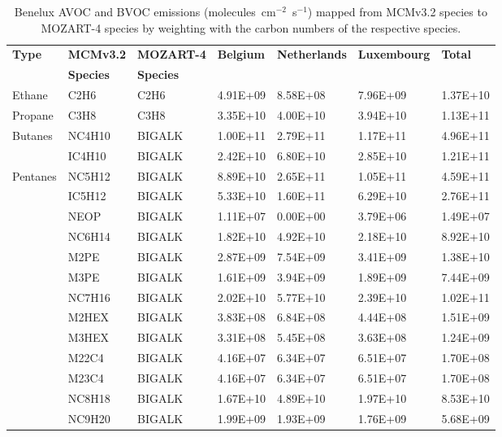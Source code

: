\footnotesize
\begin{longtable}{lllllll}
	\caption{Benelux AVOC and BVOC emissions (molecules~cm$^{-2}$~s$^{-1}$) mapped from MCMv3.2 species to MOZART-4 species by weighting with the carbon numbers of the respective species.}\\%
	\hline \hline
	\multirow{2}{*}{\textbf{Type}} & \textbf{MCMv3.2} & \textbf{MOZART-4} & \multirow{2}{*}{\textbf{Belgium}} & \multirow{2}{*}{\textbf{Netherlands}} & \multirow{2}{*}{\textbf{Luxembourg}} & \multirow{2}{*}{\textbf{Total}} \\
 & \textbf{Species} & \textbf{Species} & & & & \\
	\endhead
	\hline
	Ethane & C2H6 & C2H6 & 4.91E+09 & 8.58E+08 & 7.96E+09 & 1.37E+10 \\
	\hline Propane & C3H8 & C3H8 & 3.35E+10 & 4.00E+10 & 3.94E+10 & 1.13E+11 \\ \hline
	\multirow{2}{*}{Butanes} & NC4H10 & BIGALK & 1.00E+11 & 2.79E+11 & 1.17E+11 & 4.96E+11 \\
	 & IC4H10 & BIGALK & 2.42E+10 & 6.80E+10 & 2.85E+10 & 1.21E+11 \\
	\hline \multirow{3}{*}{Pentanes} & NC5H12 & BIGALK & 8.89E+10 & 2.65E+11 & 1.05E+11 & 4.59E+11 \\
	 & IC5H12 & BIGALK & 5.33E+10 & 1.60E+11 & 6.29E+10 & 2.76E+11 \\
	 & NEOP & BIGALK & 1.11E+07 & 0.00E+00 & 3.79E+06 & 1.49E+07 \\
	\hline \parbox[t]{2mm}{} & NC6H14 & BIGALK & 1.82E+10 & 4.92E+10 & 2.18E+10 & 8.92E+10 \\
	 & M2PE & BIGALK & 2.87E+09 & 7.54E+09 & 3.41E+09 & 1.38E+10 \\
	 & M3PE & BIGALK & 1.61E+09 & 3.94E+09 & 1.89E+09 & 7.44E+09 \\
	 & NC7H16 & BIGALK & 2.02E+10 & 5.77E+10 & 2.39E+10 & 1.02E+11 \\
	 & M2HEX & BIGALK & 3.83E+08 & 6.84E+08 & 4.44E+08 & 1.51E+09 \\
	 & M3HEX & BIGALK & 3.31E+08 & 5.45E+08 & 3.63E+08 & 1.24E+09 \\
	 & M22C4 & BIGALK & 4.16E+07 & 6.34E+07 & 6.51E+07 & 1.70E+08 \\
	 & M23C4 & BIGALK & 4.16E+07 & 6.34E+07 & 6.51E+07 & 1.70E+08 \\
	 & NC8H18 & BIGALK & 1.67E+10 & 4.89E+10 & 1.97E+10 & 8.53E+10 \\
	 & NC9H20 & BIGALK & 1.99E+09 & 1.93E+09 & 1.76E+09 & 5.68E+09 \\

\end{longtable}

